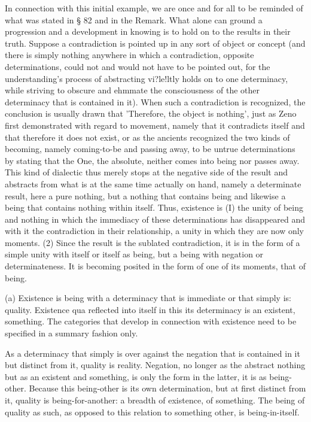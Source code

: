     In connection with this initial example,
    we are once and for all to be reminded
    of what was stated in § 82 and in the Remark.
    What alone can ground a progression and
    a development in knowing is
    to hold on to the results in their truth.
    Suppose a contradiction is pointed up
    in any sort of object or concept
    (and there is simply nothing anywhere in which a contradiction,
    opposite determinations, could not and would not have to be
    pointed out, for the understanding's process of abstracting vi?le!ltly
    holds on to one determinacy, while striving to obscure and ehmmate
    the consciousness of the other determinacy that is contained in it).
    When such a contradiction is recognized,
    the conclusion is usually drawn that
    'Therefore, the object is nothing',
    just as Zeno first demonstrated with regard to movement,
    namely that it contradicts itself
    and that therefore it does not exist,
    or as the ancients recognized the two kinds of becoming,
    namely coming-to-be and passing away,
    to be untrue determinations by stating that the One,
    the absolute, neither comes into being nor passes away.
    This kind of dialectic thus merely stops
    at the negative side of the result
    and abstracts from what is at the same time
    actually on hand, namely a determinate result,
    here a pure nothing, but a nothing that contains being
    and likewise a being that contains nothing within itself.
    Thus, existence is
    (I) the unity of being and nothing
    in which the immediacy of these determinations has disappeared
    and with it the contradiction in their relationship,
    a unity in which they are now only moments.
    (2) Since the result is the sublated contradiction,
    it is in the form of a simple unity with itself
    or itself as being, but a being with negation or determinateness.
    It is becoming posited in the form of one of its moments,
    that of being.

(a) Existence is being with a determinacy
that is immediate or that simply is: quality.
Existence qua reflected into itself in this
its determinacy is an existent, something.
The categories that develop in connection with existence
need to be specified in a summary fashion only.

As a determinacy that simply is over against the negation
that is contained in it but distinct from it,
quality is reality.
Negation, no longer as the abstract nothing
but as an existent and something, is
only the form in the latter, it is as being-other.
Because this being-other is its own determination,
but at first distinct from it,
quality is being-for-another: a breadth of existence, of something.
The being of quality as such,
as opposed to this relation to something other,
is being-in-itself.

